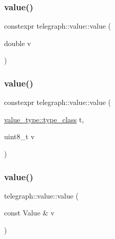 \mbox{\label{classtelegraph_1_1value_af0ad714556beb9cac21b887c4e67055f}} 
\subsubsection{\texorpdfstring{value()}{value()}\hspace{0.1cm}{\footnotesize\ttfamily [12/14]}}
{\footnotesize\ttfamily constexpr telegraph\+::value\+::value (\begin{DoxyParamCaption}\item[{double}]{v }\end{DoxyParamCaption})\hspace{0.3cm}{\ttfamily [inline]}}

\mbox{\label{classtelegraph_1_1value_ad96b01fa30ad481c4695df1d06e9aa12}} 
\subsubsection{\texorpdfstring{value()}{value()}\hspace{0.1cm}{\footnotesize\ttfamily [13/14]}}
{\footnotesize\ttfamily constexpr telegraph\+::value\+::value (\begin{DoxyParamCaption}\item[{\hyperlink{classtelegraph_1_1value__type_a516081c0a4e231cb22554f48f052ff6f}{value\+\_\+type\+::type\+\_\+class}}]{t,  }\item[{uint8\+\_\+t}]{v }\end{DoxyParamCaption})\hspace{0.3cm}{\ttfamily [inline]}}

\mbox{\label{classtelegraph_1_1value_a3fad9e2214835f095af02feb1f91c49a}} 
\subsubsection{\texorpdfstring{value()}{value()}\hspace{0.1cm}{\footnotesize\ttfamily [14/14]}}
{\footnotesize\ttfamily telegraph\+::value\+::value (\begin{DoxyParamCaption}\item[{const Value \&}]{v }\end{DoxyParamCaption})\hspace{0.3cm}{\ttfamily [inline]}}



